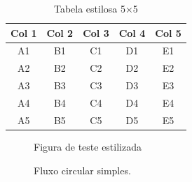 \documentclass{Arquivos/TrabalhoAcademico}
\begin{document}
\begin{table}[ht]
    \centering
    \caption{Tabela estilosa 5×5}
    \label{tab:estilosa}
    \begin{tabular}{ccccc}
        \toprule
        Col 1 & Col 2 & Col 3 & Col 4 & Col 5 \\
        \midrule
        A1 & B1 & C1 & D1 & E1 \\
        A2 & B2 & C2 & D2 & E2 \\
        A3 & B3 & C3 & D3 & E3 \\
        A4 & B4 & C4 & D4 & E4 \\
        A5 & B5 & C5 & D5 & E5 \\
        \bottomrule
    \end{tabular}
\end{table}

\begin{figure}[ht]
    \centering
    \caption{Figura de teste estilizada}
    \label{fig:teste-estilosa}
\end{figure}

\begin{figure}[ht]
    \centering
    \caption{Fluxo circular simples.}
    \label{fig:fluxo-simples}
\end{figure}
\end{document}
